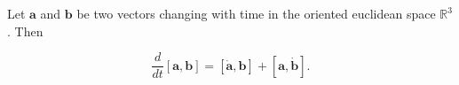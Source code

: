 Let $\mathbf{a}$ and $\mathbf{b}$ be two vectors changing with time in the oriented euclidean space $\mathbb{R}^3$. Then

$$\frac{d}{dt} [\mathbf{a}, \mathbf{b}] = [\dot{\mathbf{a}}, \mathbf{b}] + [\mathbf{a}, \dot{\mathbf{b}}].$$
